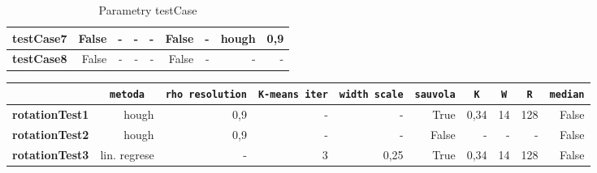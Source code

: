\documentclass[thesis=B,czech]{FITthesis}[2019/12/23]
\def\myit#1{\texttt{#1}}
\begin{document}
{\begin{landscape}
\begin{table}[]
\begin{tabular}{|r|r|r|r|r|r|r|r|r|}
				\textbf{testCase7} & False                               & -                             & -                             & -                             & False                              & -                                    & hough                              & 0,9                                        \\ \hline
				\textbf{testCase8} & False                               & -                             & -                             & -                             & False                              & -                                    & -                                  & -                                          \\ \hline
			\end{tabular}
			\caption{Parametry testCase}
			\label{fig:hyper-testcase}
		\end{table}
		\begin{table}[]
			\centering
			\begin{tabular}{|r|r|r|r|r|r|r|r|r|r|}
				\hline
				{}                     & \multicolumn{1}{c|}{\myit{metoda}} & \multicolumn{1}{c|}{\myit{rho resolution}} & \multicolumn{1}{c|}{\myit{K-means iter}} & \multicolumn{1}{c|}{\myit{width scale}} & \multicolumn{1}{c|}{\myit{sauvola}} & \multicolumn{1}{c|}{\myit{K}} & \multicolumn{1}{c|}{\myit{W}} & \multicolumn{1}{c|}{\myit{R}} & \multicolumn{1}{c|}{\myit{median}} \\ \hline
				\textbf{rotationTest1} & hough                              & 0,9                                        & -                                        & -                                       & True                                & 0,34                          & 14                            & 128                           & False                              \\ \hline
				\textbf{rotationTest2} & hough                              & 0,9                                        & -                                        & -                                       & False                               & -                             & -                             & -                             & False                              \\ \hline
				\textbf{rotationTest3} & lin. regrese                       & -                                          & 3                                        & 0,25                                    & True                                & 0,34                          & 14                            & 128                           & False                              \\ \hline

\end{tabular}
\end{table}
\end{landscape}}
\end{document}
